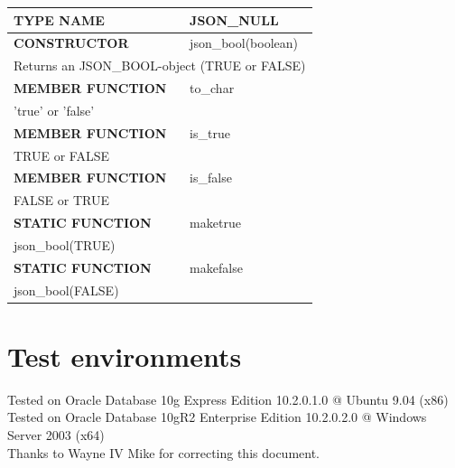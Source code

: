 \documentclass[11pt,twocolumn, a4paper]{article}
\begin{document}
\begin{longtable}{| l | l |}

\hline
  \rowcolor{gray}\color{white}
  \textbf{TYPE NAME} & \color{white}\textbf{JSON\_NULL} \\
\hline

\hline
  \textbf{CONSTRUCTOR} & json\_bool(boolean)\\
\hline
  \multicolumn{2}{|p{15cm}|}{Returns an JSON\_BOOL-object (TRUE or FALSE)} \\
\hline

\hline
  \textbf{MEMBER FUNCTION} & to\_char \\
\hline
  \multicolumn{2}{|p{15cm}|}{'true' or 'false'} \\
\hline

\hline
  \textbf{MEMBER FUNCTION} & is\_true \\
\hline
  \multicolumn{2}{|p{15cm}|}{TRUE or FALSE} \\
\hline

\hline
  \textbf{MEMBER FUNCTION} & is\_false \\
\hline
  \multicolumn{2}{|p{15cm}|}{FALSE or TRUE} \\
\hline

\hline
  \textbf{STATIC FUNCTION} & maketrue \\
\hline
  \multicolumn{2}{|p{15cm}|}{json\_bool(TRUE)} \\
\hline

\hline
  \textbf{STATIC FUNCTION} & makefalse \\
\hline
  \multicolumn{2}{|p{15cm}|}{json\_bool(FALSE)} \\
\hline

\end{longtable}

\section*{Test environments}
Tested on Oracle Database 10g Express Edition 10.2.0.1.0 @ Ubuntu 9.04 (x86)\\
Tested on Oracle Database 10gR2 Enterprise Edition 10.2.0.2.0 @ Windows Server 2003 (x64)\\
Thanks to Wayne IV Mike for correcting this document.
\end{document}
